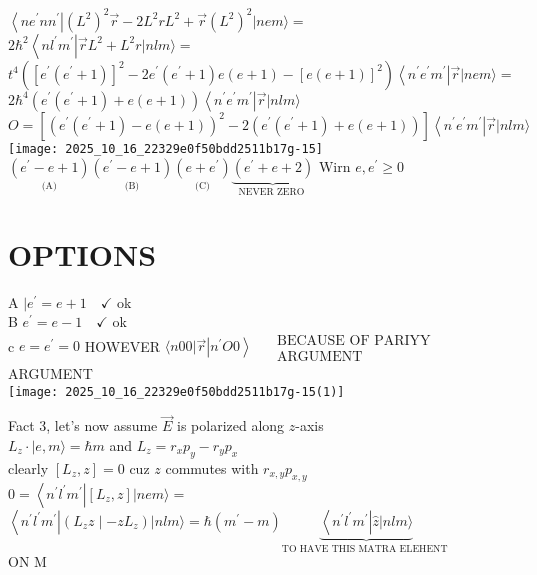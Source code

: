 $\left\langle n e^{\prime} n n^{\prime}\right|\left(L^{2}\right)^{2} \vec{r}-2 L^{2} r L^{2}+\vec{r}\left(L^{2}\right)^{2}|n e m\rangle=$\\
$2 \hbar^{2}\left\langle n l^{\prime} m^{\prime}\right| \vec{r} L^{2}+L^{2} r|n l m\rangle=$\\
$t^{4}\left(\left[e^{\prime}\left(e^{\prime}+1\right)\right]^{2}-2 e^{\prime}\left(e^{\prime}+1\right) e(e+1)-[e(e+1)]^{2}\right)\left\langle n^{\prime} e^{\prime} m^{\prime}\right| \vec{r}|n e m\rangle=$\\
$2 \hbar^{4}\left(e^{\prime}\left(e^{\prime}+1\right)+e(e+1)\right)\left\langle n^{\prime} e^{\prime} m^{\prime}\right| \vec{r}|n l m\rangle$\\
$O=\left[\left(e^{\prime}\left(e^{\prime}+1\right)-e(e+1)\right)^{2}-2\left(e^{\prime}\left(e^{\prime}+1\right)+e(e+1)\right)\right]\left\langle n^{\prime} e^{\prime} m^{\prime}\right| \vec{r}|n l m\rangle$\\
\texttt{[image: 2025\_10\_16\_22329e0f50bdd2511b17g-15]}\\
$\underset{\text { (A) }}{\left(e^{\prime}-e+1\right)} \underset{\text { (B) }}{\left(e^{\prime}-e+1\right)} \underset{\text { (C) }}{\left(e+e^{\prime}\right)} \underbrace{\left(e^{\prime}+e+2\right)}_{\text {NEVER ZERO }}$ Wirn $e, e^{\prime} \geqslant 0$

\section*{OPTIONS}
A $\mid e^{\prime}=e+1 \quad \checkmark$ ok\\
B $e^{\prime}=e-1 \quad \checkmark$ ok\\
c $e=e^{\prime}=0$ HOWEVER $\langle n 00| \vec{r}\left|n^{\prime} O 0\right\rangle \quad \begin{gathered}\text { BECAUSE OF PARIYY } \\ \text { ARGUMENT }\end{gathered}$ ARGUMENT\\
\texttt{[image: 2025\_10\_16\_22329e0f50bdd2511b17g-15(1)]}

Fact 3, let's now assume $\vec{E}$ is polarized along $z$-axis\\
$L_{z} \cdot|e, m\rangle=\hbar m$ and $L_{z}=r_{x} p_{y}-r_{y} p_{x}$\\
clearly $\left[L_{z}, z\right]=0$ cuz $z$ commutes with $r_{x, y} p_{x, y}$\\
$0=\left\langle n^{\prime} l^{\prime} m^{\prime}\right|\left[L_{z}, z\right]|n e m\rangle=$\\
$\left\langle n^{\prime} l^{\prime} m^{\prime}\right|\left(L_{z} z \mid-z L_{z}\right)|n l m\rangle=\hbar\left(m^{\prime}-m\right) \underbrace{\left\langle n^{\prime} l^{\prime} m^{\prime}\right| \hat{z}|n l m\rangle}_{\text {TO HAVE THIS MATRA ELEHENT }}$\\
ON M

